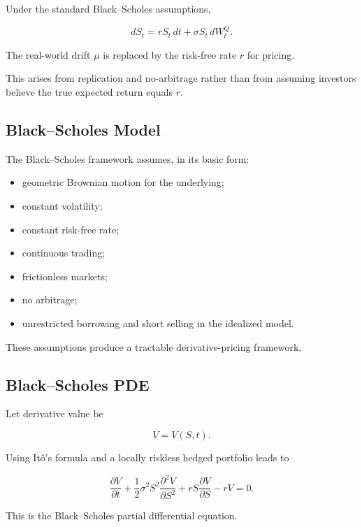 Under the standard Black--Scholes assumptions,

\[
\boxed{
dS_t
=
rS_t\,dt
+
\sigma S_t\,dW_t^{Q}.
}
\]

The real-world drift \(\mu\) is replaced by the risk-free rate \(r\) for
pricing.

This arises from replication and no-arbitrage rather than from assuming
investors believe the true expected return equals \(r\).

\subsection{Black--Scholes Model}
\label{subsec:black-scholes-model}

The Black--Scholes framework assumes, in its basic form:

\begin{itemize}
    \item geometric Brownian motion for the underlying;
    \item constant volatility;
    \item constant risk-free rate;
    \item continuous trading;
    \item frictionless markets;
    \item no arbitrage;
    \item unrestricted borrowing and short selling in the idealized model.
\end{itemize}

These assumptions produce a tractable derivative-pricing framework.

\subsection{Black--Scholes PDE}
\label{subsec:black-scholes-pde}

Let derivative value be

\[
V=V(S,t).
\]

Using It\^o's formula and a locally riskless hedged portfolio leads to

\[
\boxed{
\frac{\partial V}{\partial t}
+
\frac12\sigma^2S^2
\frac{\partial^2V}{\partial S^2}
+
rS
\frac{\partial V}{\partial S}
-
rV
=
0.
}
\]

This is the Black--Scholes partial differential equation.

